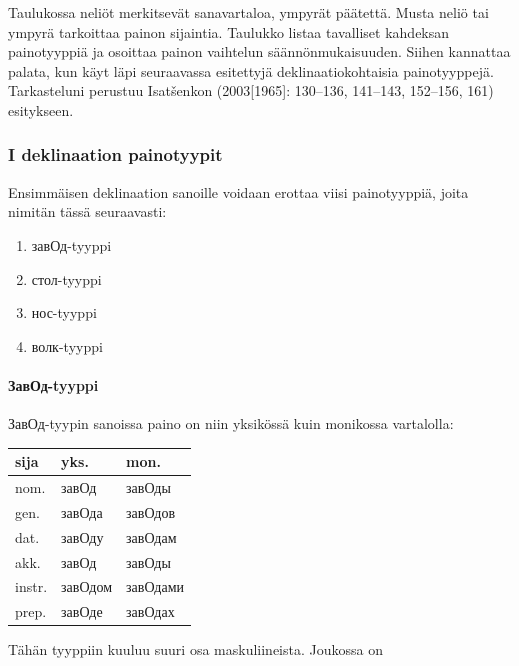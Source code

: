 \documentclass[]{scrartcl}
\providecommand{\tightlist}{%
  \setlength{\itemsep}{0pt}\setlength{\parskip}{0pt}}
\begin{document}
Taulukossa neliöt merkitsevät sanavartaloa, ympyrät päätettä. Musta
neliö tai ympyrä tarkoittaa painon sijaintia. Taulukko listaa tavalliset
kahdeksan painotyyppiä ja osoittaa painon vaihtelun säännönmukaisuuden.
Siihen kannattaa palata, kun käyt läpi seuraavassa esitettyjä
deklinaatiokohtaisia painotyyppejä. Tarkasteluni perustuu Isatšenkon
(2003{[}1965{]}: 130--136, 141--143, 152--156, 161) esitykseen.

\subsubsection{I deklinaation
painotyypit}\label{i-deklinaation-painotyypit}

Ensimmäisen deklinaation sanoille voidaan erottaa viisi painotyyppiä,
joita nimitän tässä seuraavasti:

\begin{enumerate}
\def\labelenumi{\arabic{enumi}.}
\tightlist
\item
  завОд-tyyppi
\item
  стол-tyyppi
\item
  нос-tyyppi
\item
  волк-tyyppi
\end{enumerate}

\paragraph{ЗавОд-tyyppi}\label{ux437ux430ux432ux43eux434-tyyppi}

ЗавОд-tyypin sanoissa paino on niin yksikössä kuin monikossa vartalolla:

\begin{longtable}[c]{@{}lll@{}}
\toprule
sija & yks. & mon.\tabularnewline
\midrule
\endhead
nom. & завОд & завОды\tabularnewline
gen. & завОда & завОдов\tabularnewline
dat. & завОду & завОдам\tabularnewline
akk. & завОд & завОды\tabularnewline
instr. & завОдом & завОдами\tabularnewline
prep. & завОде & завОдах\tabularnewline
\bottomrule
\end{longtable}

Tähän tyyppiin kuuluu suuri osa maskuliineista. Joukossa on
\end{document}
